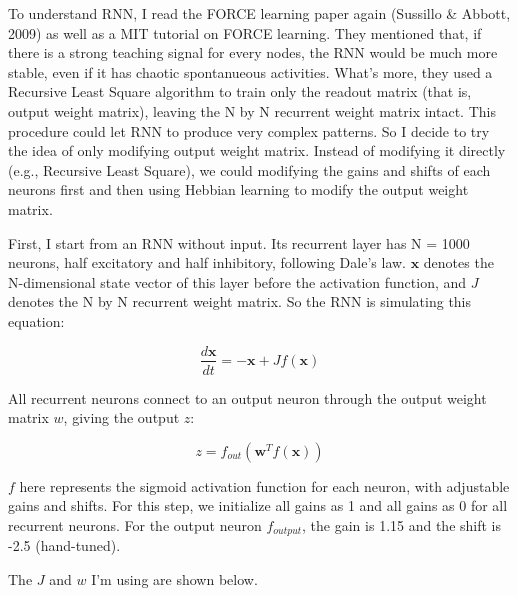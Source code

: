 \documentclass[12pt, a4paper]{article}
\begin{document}
To understand RNN, I read the FORCE learning paper again (Sussillo \& Abbott, 2009) as well as a MIT tutorial on FORCE learning. They mentioned that, if there is a strong teaching signal for every nodes, the RNN would be much more stable, even if it has chaotic spontanueous activities. What's more, they used a Recursive Least Square algorithm to train only the readout matrix (that is, output weight matrix), leaving the N by N recurrent weight matrix intact. This procedure could let RNN to produce very complex patterns. So I decide to try the idea of only modifying output weight matrix. Instead of modifying it directly (e.g., Recursive Least Square), we could modifying the gains and shifts of each neurons first and then using Hebbian learning to modify the output weight matrix.

First, I start from an RNN without input. Its recurrent layer has N = 1000 neurons, half excitatory and half inhibitory, following Dale's law. $\mathbf{x}$ denotes the N-dimensional state vector of this layer before the activation function, and $J$ denotes the N by N recurrent weight matrix. So the RNN is simulating this equation:

$$\frac{d\mathbf{x}}{dt} = -\mathbf{x} + J f(\mathbf{x}) $$

All recurrent neurons connect to an output neuron through the output weight matrix $w$, giving the output $z$:

$$z = f_{out}(\mathbf{w}^T f(\mathbf{x}))$$

$f$ here represents the sigmoid activation function for each neuron, with adjustable gains and shifts. For this step, we initialize all gains as 1 and all gains as 0 for all recurrent neurons. For the output neuron $f_{output}$, the gain is 1.15 and the shift is -2.5 (hand-tuned).

The $J$ and $w$ I'm using are shown below.
\end{document}
